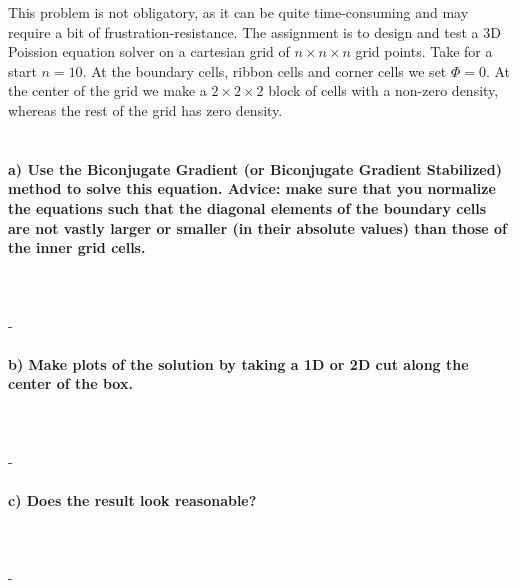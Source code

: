 This problem is not obligatory, as it can be quite time-consuming and 
may require a bit of frustration-resistance. The assignment is to 
design and test a 3D Poission equation solver on a cartesian grid of 
$n\times n\times n$ grid points. Take for a start $n=10$. At the 
boundary cells, ribbon cells and corner cells we set $\Phi=0$. At the 
center of the grid we make a $2\times 2\times 2$ block of cells with a 
non-zero density, whereas the rest of the grid has zero density. \\ 
\\
\paragraph{
    a) Use the Biconjugate Gradient (or Biconjugate Gradient Stabilized) 
    method to solve this equation. Advice: make sure that you normalize 
    the equations such that the diagonal elements of the boundary cells 
    are not vastly larger or smaller (in their absolute values) than 
    those of the inner grid cells.
} \ \\
    \\
    -


\paragraph{
    b) Make plots of the solution by taking a 1D or 2D cut along the 
    center of the box.
} \ \\
    \\
    -

\paragraph{
    c) Does the result look reasonable?
} \ \\
    \\
    -
